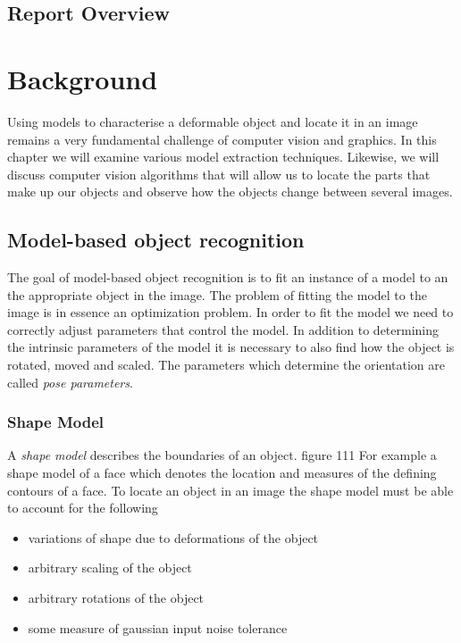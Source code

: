 \documentclass[11pt,a4paper]{book}
\begin{document}
\section{Report Overview}

\newpage

\chapter{Background}
Using models to characterise a deformable object and locate it in an image remains
a very fundamental challenge of computer vision and graphics. In this chapter we
will examine various model extraction techniques. Likewise, we will discuss
computer vision algorithms that will allow us to locate the parts that make up
our objects and observe how the objects change between several images.
\section{Model-based object recognition}
The goal of model-based object recognition is to fit an instance of a model to
an the appropriate object in the image. The problem of fitting the model to the
image is in essence an optimization problem. In order to fit the model we need to
correctly adjust parameters that control the model. In addition to determining
the intrinsic parameters of the model it is necessary to also find how the
object is rotated, moved and scaled. The parameters which determine the
orientation are called \textit{pose parameters}. 

\subsection{Shape Model}
A \textit{shape model} describes the boundaries of an object. figure 111 For example a
shape model of a face which denotes the location and measures of the defining
contours of a face. To locate an object in an image the shape model must be able to
account for the following
\begin{itemize}
\item variations of shape due to deformations of the object
\item arbitrary scaling of the object
\item arbitrary rotations of the object
\item some measure of gaussian input noise tolerance
\end{itemize}
\end{document}
